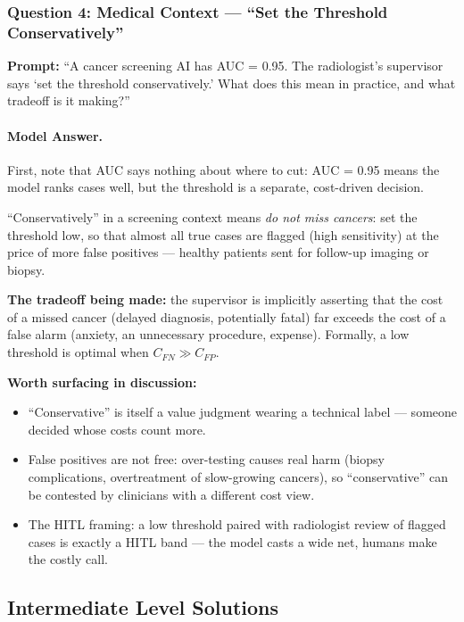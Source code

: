 \subsubsection{Question 4: Medical Context --- ``Set the Threshold Conservatively''}

\textbf{Prompt:} ``A cancer screening AI has AUC = 0.95. The radiologist's supervisor says `set the threshold conservatively.' What does this mean in practice, and what tradeoff is it making?''

\paragraph{Model Answer.}

First, note that AUC says nothing about where to cut: AUC = 0.95 means the model ranks cases well, but the threshold is a separate, cost-driven decision.

``Conservatively'' in a screening context means \emph{do not miss cancers}: set the threshold low, so that almost all true cases are flagged (high sensitivity) at the price of more false positives --- healthy patients sent for follow-up imaging or biopsy.

\textbf{The tradeoff being made:} the supervisor is implicitly asserting that the cost of a missed cancer (delayed diagnosis, potentially fatal) far exceeds the cost of a false alarm (anxiety, an unnecessary procedure, expense). Formally, a low threshold is optimal when $C_{FN} \gg C_{FP}$.

\textbf{Worth surfacing in discussion:}
\begin{itemize}
    \item ``Conservative'' is itself a value judgment wearing a technical label --- someone decided whose costs count more.
    \item False positives are not free: over-testing causes real harm (biopsy complications, overtreatment of slow-growing cancers), so ``conservative'' can be contested by clinicians with a different cost view.
    \item The HITL framing: a low threshold paired with radiologist review of flagged cases is exactly a HITL band --- the model casts a wide net, humans make the costly call.
\end{itemize}

\subsection{Intermediate Level Solutions}

